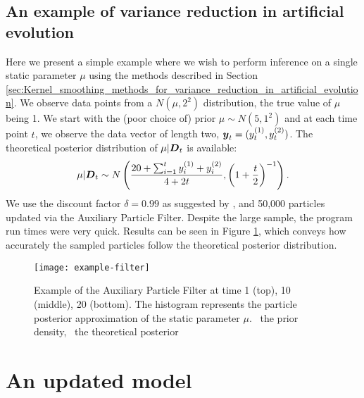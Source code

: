 \subsection{An example of variance reduction in artificial evolution}

Here we present a simple example where we wish to perform inference on a single static parameter \(\mu\) using the
methods described in Section \ref{sec:Kernel_smoothing_methods_for_variance_reduction_in_artificial_evolution}. We
observe data points from a \(N(\mu, 2^2)\) distribution, the true value of \(\mu\) being 1. We start with the (poor
choice of) prior \(\mu \sim N(5, 1^2)\) and at each time point \(t\), we observe the data vector of length two,
\(\boldsymbol{y}_t = (y_t^{(1)}, y_t^{(2)})\). The theoretical posterior distribution of \(\mu | \boldsymbol{D}_t\) is available:
\begin{align} 
\mu | \boldsymbol{D}_t \sim N\left( \frac{20 + \sum_{i=1}^{t} y_i^{(1)} + y_i^{(2)}}{4 + 2t},
\left(1 + \frac{t}{2}\right)^{-1} \right).
\end{align}
We use the discount factor \(\delta = 0.99\) as suggested by \cite{liu2001}, and 50,000 particles updated via the
Auxiliary Particle Filter. Despite the large sample, the program run times were very quick. Results can be seen in
Figure \ref{fig:filter1}, which conveys how accurately the sampled particles follow the theoretical posterior
distribution.
\begin{figure}[htp]
\begin{center}
\texttt{[image: example-filter]}
\caption{Example of the Auxiliary Particle Filter at time 1 (top), 10 (middle), 20 (bottom). The histogram represents
the particle posterior approximation of the static parameter \(\mu\). \protect\blueSolidLine\ the prior density,
\protect\greenSolidLine\ the theoretical posterior}
\label{fig:filter1}
\end{center}
\end{figure}

\section{An updated model}
\label{sec:An_updated_model}

